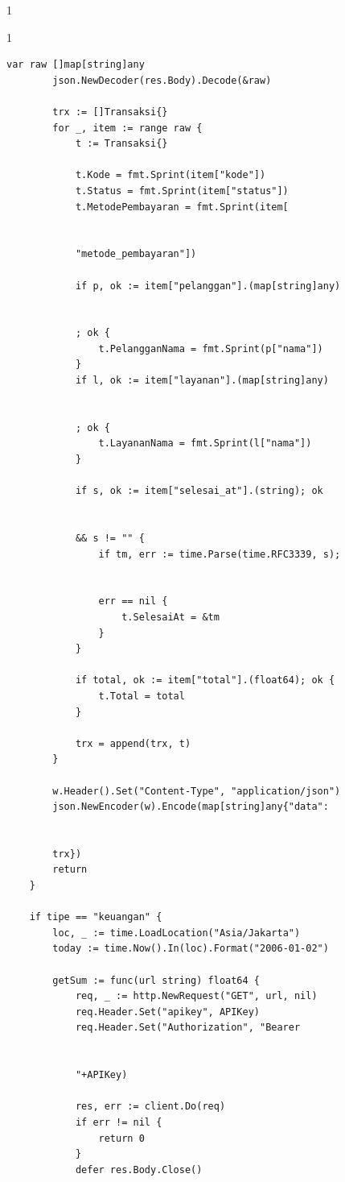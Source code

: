 \begin{enumerate}
\begin{spacing}{1}
\begin{spacing}{1}
\begin{Verbatim}[frame=single, fontsize=\small]
        var raw []map[string]any
        json.NewDecoder(res.Body).Decode(&raw)

        trx := []Transaksi{}
        for _, item := range raw {
            t := Transaksi{}

            t.Kode = fmt.Sprint(item["kode"])
            t.Status = fmt.Sprint(item["status"])
            t.MetodePembayaran = fmt.Sprint(item[
                
            
            "metode_pembayaran"])

            if p, ok := item["pelanggan"].(map[string]any)
            
            
            ; ok {
                t.PelangganNama = fmt.Sprint(p["nama"])
            }
            if l, ok := item["layanan"].(map[string]any)
            
            
            ; ok {
                t.LayananNama = fmt.Sprint(l["nama"])
            }

            if s, ok := item["selesai_at"].(string); ok 
            
            
            && s != "" {
                if tm, err := time.Parse(time.RFC3339, s); 
                
                
                err == nil {
                    t.SelesaiAt = &tm
                }
            }

            if total, ok := item["total"].(float64); ok {
                t.Total = total
            }

            trx = append(trx, t)
        }

        w.Header().Set("Content-Type", "application/json")
        json.NewEncoder(w).Encode(map[string]any{"data": 
        
        
        trx})
        return
    }

    if tipe == "keuangan" {
        loc, _ := time.LoadLocation("Asia/Jakarta")
        today := time.Now().In(loc).Format("2006-01-02")

        getSum := func(url string) float64 {
            req, _ := http.NewRequest("GET", url, nil)
            req.Header.Set("apikey", APIKey)
            req.Header.Set("Authorization", "Bearer 
            
            
            "+APIKey)

            res, err := client.Do(req)
            if err != nil {
                return 0
            }
            defer res.Body.Close()


\end{Verbatim}
\end{spacing}
\end{spacing}
\end{enumerate}
